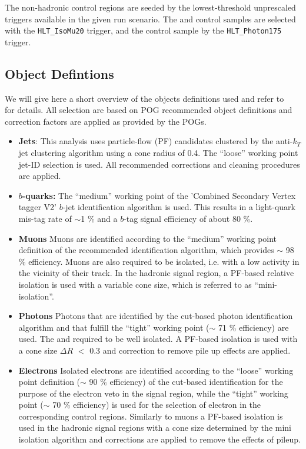 The non-hadronic control regions are seeded by the lowest-threshold unprescaled triggers available in the given run scenario. The \mj and \mmj control samples are selected with the \verb!HLT_IsoMu20! trigger, and the \gj control sample by the \verb!HLT_Photon175! trigger. 


\subsection{Object Defintions}

We will give here a short overview of the objects definitions used and refer to ~\cite{alphaTnote} for details. All selection are based on POG recommended object definitions and correction factors are applied as provided by the POGs.

\begin{itemize}
  \item{\bf Jets}: This analysis uses particle-flow (PF) candidates clustered by the anti-$k_{T}$ jet clustering algorithm \cite{Cacciari:2008gp} using a cone radius of 0.4. The ``loose'' working point jet-ID selection is used. All recommended corrections and cleaning procedures are applied.   %
    
  \item{\bf $b$-quarks:} The  ``medium'' working point of the 'Combined Secondary Vertex tagger V2' $b$-jet identification algorithm is used. This results in a light-quark mis-tag rate of $\sim$1 \%  and a $b$-tag signal efficiency of about 80 \%.   

  \item{\bf Muons} Muons are identified according to the ``medium'' working point definition of the recommended identification algorithm, which provides $\sim$ 98 $\%$ efficiency. 
Muons are also required to be isolated, i.e. with a low activity in the vicinity of their track. In the hadronic signal region, a PF-based relative isolation is used with a variable cone size, which is referred to as ``mini-isolation''. 

  \item{\bf Photons} Photons that are identified by the cut-based photon identification algorithm \cite{photon-id} and that fulfill the ``tight'' working point ($\sim$ 71 $\%$ efficiency) are used. The and required to be well isolated.  A PF-based isolation is used with a cone size $\Delta R$ $<$ 0.3  and correction to remove pile up effects are applied.


  \item{\bf Electrons} Isolated electrons are identified according to the ``loose'' working point definition ($\sim$ 90 $\%$ efficiency)  of the cut-based identification \cite{electron-id} for the purpose of the electron veto in the signal region, while the ``tight'' working point ($\sim$ 70 $\%$ efficiency) is used for the selection of electron in the corresponding control regions. Similarly to muons a PF-based isolation \cite{pf-photon} is used in the hadronic signal regions with a cone size determined by the mini isolation algorithm and corrections are applied to remove the effects of pileup.


\end{itemize}
